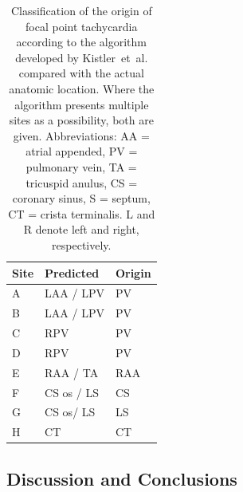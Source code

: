 \begin{table}[h]
\caption[Classification of focal point tachycardia]{
\label{tbl:forward:fat:kistler}
Classification of the origin of focal point tachycardia according to the
algorithm developed by Kistler~et~al. compared with the actual anatomic
location.
Where the algorithm presents multiple sites as a possibility, both are given.
Abbreviations: AA = atrial appended, PV = pulmonary vein, TA = tricuspid anulus,
CS = coronary sinus, S = septum, CT = crista terminalis.
L and R denote left and right, respectively.
}
\begin{center}
\begin{tabular}{l l l}
\toprule
Site & Predicted  & Origin \\
\midrule
A & LAA / LPV & PV \\
B & LAA / LPV & PV \\
C & RPV & PV \\
D & RPV & PV \\
E & RAA / TA & RAA \\
F & CS os / LS & CS \\
G & CS os/ LS & LS \\
H & CT & CT \\
\bottomrule
\end{tabular}
\end{center}
\end{table}

\subsection{Discussion and Conclusions}


